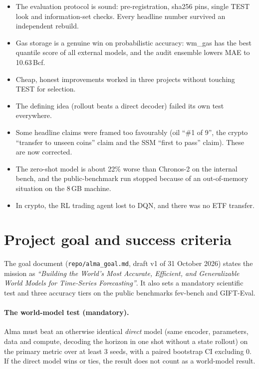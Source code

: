 \documentclass[10pt,a4paper]{article}
\newcommand{\src}[1]{{\footnotesize\texttt{#1}}}
\begin{document}
\begin{goodbox}[title=What went well]
\begin{itemize}
\item The evaluation protocol is sound: pre-registration, sha256 pins, single TEST look and information-set checks. Every headline number survived an independent rebuild.
\item Gas storage is a genuine win on probabilistic accuracy: wm\_gas has the best quantile score of all external models, and the audit ensemble lowers MAE to 10.63\,Bcf.
\item Cheap, honest improvements worked in three projects without touching TEST for selection.
\end{itemize}
\end{goodbox}
\begin{badbox}[title=What went wrong]
\begin{itemize}
\item The defining idea (rollout beats a direct decoder) failed its own test everywhere.
\item Some headline claims were framed too favourably (oil ``\#1 of 9'', the crypto ``transfer to unseen coins'' claim and the SSM ``first to pass'' claim). These are now corrected.
\item The zero-shot model is about 22\% worse than Chronos-2 on the internal bench, and the public-benchmark run stopped because of an out-of-memory situation on the 8\,GB machine.
\item In crypto, the RL trading agent lost to DQN, and there was no ETF transfer.
\end{itemize}
\end{badbox}

\section{Project goal and success criteria}
\label{sec:goal}

The goal document (\src{repo/alma\_goal.md}, draft v1 of 31 October 2026) states the mission as \emph{``Building the World's Most Accurate, Efficient, and Generalizable World Models for Time-Series Forecasting''}. It also sets a mandatory scientific test and three accuracy tiers on the public benchmarks fev-bench and GIFT-Eval.

\paragraph{The world-model test (mandatory).} Alma must beat an otherwise identical \emph{direct} model (same encoder, parameters, data and compute, decoding the horizon in one shot without a state rollout) on the primary metric over at least 3 seeds, with a paired bootstrap CI excluding 0. If the direct model wins or ties, the result does not count as a world-model result.
\end{document}
